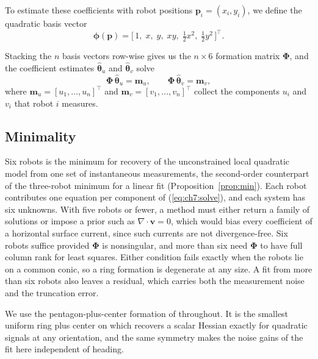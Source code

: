 To estimate these coefficients with robot positions $\mathbf{p}_i = (x_i,
y_i)$, we define the quadratic basis vector
\begin{equation}
    \boldsymbol{\phi}(\mathbf{p}) =
    \bigl[\,1, \; x, \; y, \; xy, \;
    \tfrac{1}{2}x^2, \; \tfrac{1}{2}y^2\,\bigr]^\top.
\end{equation}



Stacking the $n$ basis vectors row-wise gives us the $n \times 6$ formation matrix $\boldsymbol{\Phi}$, and the coefficient estimates $\hat{\boldsymbol{\theta}}_u$ and $\hat{\boldsymbol{\theta}}_v$ solve
\begin{equation}
\boldsymbol{\Phi}\,\hat{\boldsymbol{\theta}}_u = \mathbf{m}_u, \qquad
\boldsymbol{\Phi}\,\hat{\boldsymbol{\theta}}_v = \mathbf{m}_v,
\label{eq:ch7:solve}
\end{equation}
where $\mathbf{m}_u = [u_1, \ldots, u_n]^\top$ and
$\mathbf{m}_v = [v_1, \ldots, v_n]^\top$ collect the components $u_i$
and $v_i$ that robot $i$ measures.

\subsection{Minimality}
\label{sec:ch7:minimality}

Six robots is the minimum for recovery of the unconstrained local
quadratic model from one set of instantaneous measurements, the
second-order counterpart of the three-robot minimum for a linear fit
(Proposition~\ref{prop:min}). Each robot contributes one equation per component of
(\ref{eq:ch7:solve}), and each system has six unknowns. With five robots or
fewer, a method must either return a family of solutions or impose a
prior such as $\nabla\cdot\mathbf{v} = 0$, which would bias every
coefficient of a horizontal surface current, since such currents are not
divergence-free. Six robots suffice provided $\boldsymbol{\Phi}$ is
nonsingular, and more than six need $\boldsymbol{\Phi}$ to have full
column rank for least squares. Either condition fails exactly when the
robots lie on a common conic, so a ring formation is degenerate at any
size. A fit from more than six robots also leaves a residual, which
carries both the measurement noise and the truncation error.

We use the pentagon-plus-center formation of \cite{15} throughout. It is
the smallest uniform ring plus center on which \cite{15} recovers a scalar
Hessian exactly for quadratic signals at any orientation, and the same
symmetry makes the noise gains of the fit here independent of heading.

